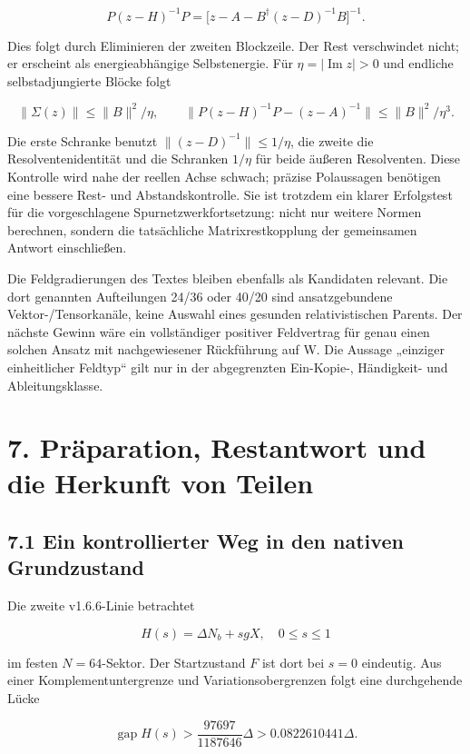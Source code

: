 \[P(z-H)^{-1}P
=\big[z-A-B^\dagger(z-D)^{-1}B\big]^{-1}.\]

Dies folgt durch Eliminieren der zweiten Blockzeile. Der Rest
verschwindet nicht; er erscheint als energieabhängige Selbstenergie. Für
\(\eta=|\operatorname{Im}z|>0\) und endliche selbstadjungierte Blöcke
folgt

\[\|\Sigma(z)\|\le\|B\|^2/\eta,\qquad
\|P(z-H)^{-1}P-(z-A)^{-1}\|\le\|B\|^2/\eta^3.\]

Die erste Schranke benutzt \(\|(z-D)^{-1}\|\le1/\eta\), die zweite die
Resolventenidentität und die Schranken \(1/\eta\) für beide äußeren
Resolventen. Diese Kontrolle wird nahe der reellen Achse schwach;
präzise Polaussagen benötigen eine bessere Rest- und Abstandskontrolle.
Sie ist trotzdem ein klarer Erfolgstest für die vorgeschlagene
Spurnetzwerkfortsetzung: nicht nur weitere Normen berechnen, sondern die
tatsächliche Matrixrestkopplung der gemeinsamen Antwort einschließen.

Die Feldgradierungen des Textes bleiben ebenfalls als Kandidaten
relevant. Die dort genannten Aufteilungen 24/36 oder 40/20 sind
ansatzgebundene Vektor-/Tensorkanäle, keine Auswahl eines gesunden
relativistischen Parents. Der nächste Gewinn wäre ein vollständiger
positiver Feldvertrag für genau einen solchen Ansatz mit nachgewiesener
Rückführung auf W. Die Aussage „einziger einheitlicher Feldtyp`` gilt
nur in der abgegrenzten Ein-Kopie-, Händigkeit- und Ableitungsklasse.

\section{7. Präparation, Restantwort und die Herkunft von
Teilen}\label{pruxe4paration-restantwort-und-die-herkunft-von-teilen}

\subsection{7.1 Ein kontrollierter Weg in den nativen
Grundzustand}\label{ein-kontrollierter-weg-in-den-nativen-grundzustand}

Die zweite v1.6.6-Linie betrachtet

\[H(s)=\Delta N_b+sgX,\quad0\le s\le1\]

im festen \(N=64\)-Sektor. Der Startzustand \(F\) ist dort bei \(s=0\)
eindeutig. Aus einer Komplementuntergrenze und Variationsobergrenzen
folgt eine durchgehende Lücke

\[\operatorname{gap}H(s)>
\frac{97697}{1187646}\Delta>0.0822610441\Delta.\]

